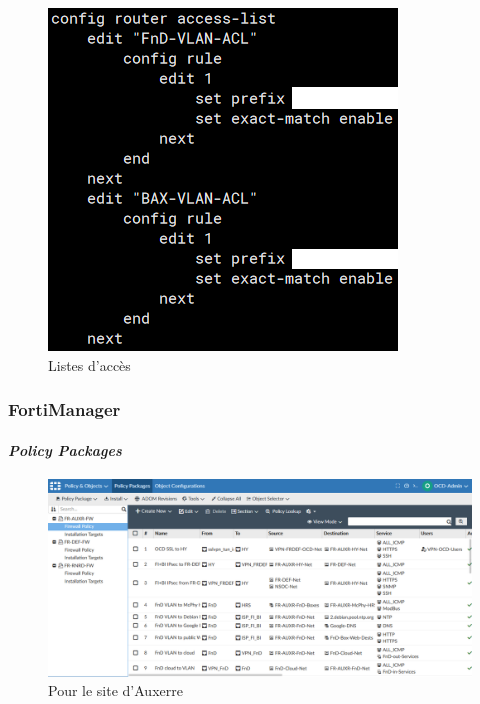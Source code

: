 \documentclass[french, a4paper]{beamer}
\begin{document}
\begin{frame}
\begin{minipage}{0.4\textwidth}
\begin{figure}[h!]
            \includegraphics[width = \linewidth]{img/fgt-auxr/acl.png}
            \caption{Listes d'accès}%
            \label{fig:fgt-auxr/acl}
        \end{figure}
    \end{minipage}
\end{frame}

\begin{frame}
    \frametitle{FortiManager}
    \framesubtitle{\textit{Policy Packages}}
    \begin{figure}[h!]
        \centering
        \includegraphics[height = 0.65\textheight]{img/fmg/policy-packages.png}
        \caption{Pour le site d'Auxerre}%
        \label{fig:fmg/policy-packages}
    \end{figure}
\end{frame}
\end{document}
